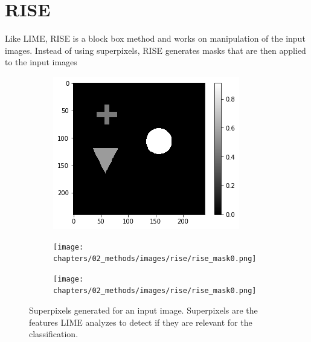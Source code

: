 \section{RISE}
Like LIME, RISE is a block box method and works on manipulation of the input images. Instead of using superpixels, RISE generates masks that are then applied to the input images


\begin{figure}[H]
    \centering
    \begin{subfigure}[t]{.30\textwidth}
        \centering
        \includegraphics[width=\linewidth]{chapters/02_methods/images/rise/rise_original.png}
        \caption{}
    \end{subfigure}\hfill%
    \begin{subfigure}[t]{.30\textwidth}
        \centering
        \texttt{[image: chapters/02\_methods/images/rise/rise\_mask0.png]}
        \caption{}
    \end{subfigure}\hfill%
    \begin{subfigure}[t]{.30\textwidth}
        \centering
        \texttt{[image: chapters/02\_methods/images/rise/rise\_mask0.png]}
        \caption{}
    \end{subfigure}
    \caption{Superpixels generated for an input image. Superpixels are the features LIME analyzes to detect if they are relevant for the classification.\cite{limeoreilly}}
    \label{lime_superpixel}
\end{figure}

